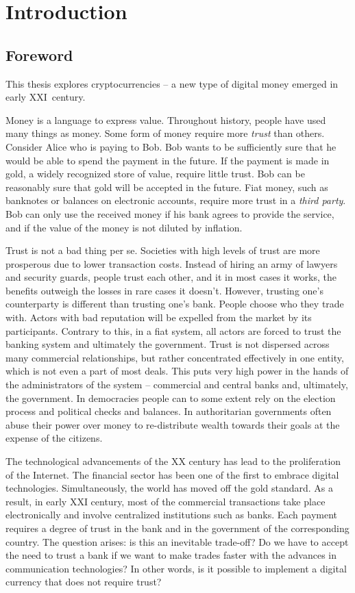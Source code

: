 \chapter{Introduction}

\label{Chapter01Introduction}

\section{Foreword}

This thesis explores cryptocurrencies -- a new type of digital money emerged in early XXI~century.

Money is a language to express value.
Throughout history, people have used many things as money.
Some form of money require more \textit{trust} than others.
Consider Alice who is paying to Bob.
Bob wants to be sufficiently sure that he would be able to spend the payment in the future.
If the payment is made in gold, a widely recognized store of value, require little trust.
Bob can be reasonably sure that gold will be accepted in the future.
Fiat money, such as banknotes or balances on electronic accounts, require more trust in a \textit{third party}.
Bob can only use the received money if his bank agrees to provide the service, and if the value of the money is not diluted by inflation.

Trust is not a bad thing per se.
Societies with high levels of trust are more prosperous due to lower transaction costs.
Instead of hiring an army of lawyers and security guards, people trust each other, and it in most cases it works, the benefits outweigh the losses in rare cases it doesn't.
However, trusting one's counterparty is different than trusting one's bank.
People choose who they trade with.
Actors with bad reputation will be expelled from the market by its participants.
Contrary to this, in a fiat system, all actors are forced to trust the banking system and ultimately the government.
Trust is not dispersed across many commercial relationships, but rather concentrated effectively in one entity, which is not even a part of most deals.
This puts very high power in the hands of the administrators of the system -- commercial and central banks and, ultimately, the government.
In democracies people can to some extent rely on the election process and political checks and balances.
In authoritarian governments often abuse their power over money to re-distribute wealth towards their goals at the expense of the citizens.

The technological advancements of the XX century has lead to the proliferation of the Internet.
The financial sector has been one of the first to embrace digital technologies.
Simultaneously, the world has moved off the gold standard.
As a result, in early XXI century, most of the commercial transactions take place electronically and involve centralized institutions such as banks.
Each payment requires a degree of trust in the bank and in the government of the corresponding country.
The question arises: is this an inevitable trade-off?
Do we have to accept the need to trust a bank if we want to make trades faster with the advances in communication technologies?
In other words, is it possible to implement a digital currency that does not require trust?

